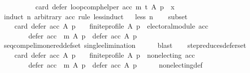 \begin{isabellebody}
\ \ \ \ \ \ \ \ \ \ card\ {\isacharparenleft}{\kern0pt}defer\ {\isacharparenleft}{\kern0pt}loop{\isacharunderscore}{\kern0pt}comp{\isacharunderscore}{\kern0pt}helper\ acc\ m\ t{\isacharparenright}{\kern0pt}\ A\ p{\isacharparenright}{\kern0pt}\ {\isacharequal}{\kern0pt}\ x{\isachardoublequoteclose}\isanewline
%
\isadelimproof
%
\endisadelimproof
%
\isatagproof
{}\isamarkupfalse%
\ {\isacharparenleft}{\kern0pt}induct\ n\ arbitrary{\isacharcolon}{\kern0pt}\ acc\ rule{\isacharcolon}{\kern0pt}\ less{\isacharunderscore}{\kern0pt}induct{\isacharparenright}{\kern0pt}\isanewline
\ \ \isamarkupfalse%
{\isacharparenleft}{\kern0pt}less\ n{\isacharparenright}{\kern0pt}\isanewline
\ \ \isamarkupfalse%
\ subset{\isacharcolon}{\kern0pt}\isanewline
\ \ \ \ {\isachardoublequoteopen}{\isacharparenleft}{\kern0pt}card\ {\isacharparenleft}{\kern0pt}defer\ acc\ A\ p{\isacharparenright}{\kern0pt}\ {\isachargreater}{\kern0pt}\ {}\ {\isasymand}\ finite{\isacharunderscore}{\kern0pt}profile\ A\ p\ {\isasymand}\ electoral{\isacharunderscore}{\kern0pt}module\ acc{\isacharparenright}{\kern0pt}\ {\isasymlongrightarrow}\isanewline
\ \ \ \ \ \ \ \ defer\ {\isacharparenleft}{\kern0pt}acc\ {\isasymtriangleright}\ m{\isacharparenright}{\kern0pt}\ A\ p\ {\isasymsubset}\ defer\ acc\ A\ p{\isachardoublequoteclose}\isanewline
\ \ \ \ \isamarkupfalse%
\ seq{\isacharunderscore}{\kern0pt}comp{\isacharunderscore}{\kern0pt}elim{\isacharunderscore}{\kern0pt}one{\isacharunderscore}{\kern0pt}red{\isacharunderscore}{\kern0pt}def{\isacharunderscore}{\kern0pt}set\ single{\isacharunderscore}{\kern0pt}elimination\isanewline
\ \ \ \ \isamarkupfalse%
\ blast\isanewline
\ \ \isamarkupfalse%
\ step{\isacharunderscore}{\kern0pt}reduces{\isacharunderscore}{\kern0pt}defer{\isacharunderscore}{\kern0pt}set{\isacharcolon}{\kern0pt}\isanewline
\ \ \ \ {\isachardoublequoteopen}{\isacharparenleft}{\kern0pt}card\ {\isacharparenleft}{\kern0pt}defer\ acc\ A\ p{\isacharparenright}{\kern0pt}\ {\isachargreater}{\kern0pt}\ {}\ {\isasymand}\ finite{\isacharunderscore}{\kern0pt}profile\ A\ p\ {\isasymand}\ non{\isacharunderscore}{\kern0pt}electing\ acc{\isacharparenright}{\kern0pt}\ {\isasymlongrightarrow}\isanewline
\ \ \ \ \ \ \ \ defer\ {\isacharparenleft}{\kern0pt}acc\ {\isasymtriangleright}\ m{\isacharparenright}{\kern0pt}\ A\ p\ {\isasymsubset}\ defer\ acc\ A\ p{\isachardoublequoteclose}\isanewline
\ \ \ \ \isamarkupfalse%
\ non{\isacharunderscore}{\kern0pt}electing{\isacharunderscore}{\kern0pt}def\isanewline

\end{isabellebody}
